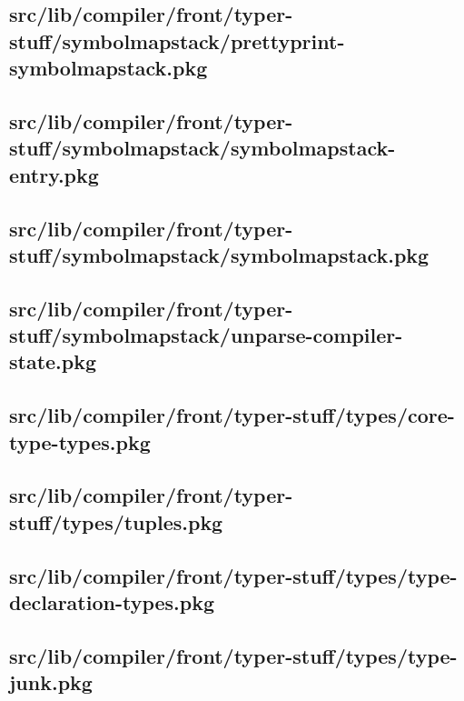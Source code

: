 \subsection{src/lib/compiler/front/typer-stuff/symbolmapstack/prettyprint-symbolmapstack.pkg}


\subsection{src/lib/compiler/front/typer-stuff/symbolmapstack/symbolmapstack-entry.pkg}


\subsection{src/lib/compiler/front/typer-stuff/symbolmapstack/symbolmapstack.pkg}


\subsection{src/lib/compiler/front/typer-stuff/symbolmapstack/unparse-compiler-state.pkg}


\subsection{src/lib/compiler/front/typer-stuff/types/core-type-types.pkg}


\subsection{src/lib/compiler/front/typer-stuff/types/tuples.pkg}


\subsection{src/lib/compiler/front/typer-stuff/types/type-declaration-types.pkg}


\subsection{src/lib/compiler/front/typer-stuff/types/type-junk.pkg}


